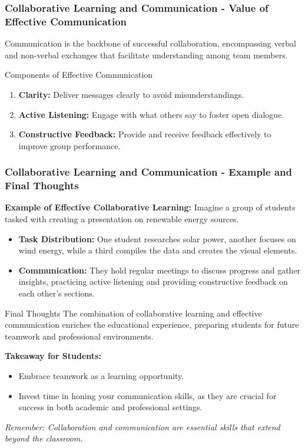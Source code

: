 \documentclass{beamer}
\begin{document}
\begin{frame}[fragile]
    \frametitle{Collaborative Learning and Communication - Value of Effective Communication}
    Communication is the backbone of successful collaboration, encompassing verbal and non-verbal exchanges that facilitate understanding among team members.
    
    \begin{block}{Components of Effective Communication}
        \begin{enumerate}
            \item \textbf{Clarity:} Deliver messages clearly to avoid misunderstandings.
            \item \textbf{Active Listening:} Engage with what others say to foster open dialogue.
            \item \textbf{Constructive Feedback:} Provide and receive feedback effectively to improve group performance.
        \end{enumerate}
    \end{block}
\end{frame}

\begin{frame}[fragile]
    \frametitle{Collaborative Learning and Communication - Example and Final Thoughts}
    \textbf{Example of Effective Collaborative Learning:} 
    Imagine a group of students tasked with creating a presentation on renewable energy sources.
    \begin{itemize}
        \item \textbf{Task Distribution:} One student researches solar power, another focuses on wind energy, while a third compiles the data and creates the visual elements. 
        \item \textbf{Communication:} They hold regular meetings to discuss progress and gather insights, practicing active listening and providing constructive feedback on each other’s sections.
    \end{itemize}

    \begin{block}{Final Thoughts}
        The combination of collaborative learning and effective communication enriches the educational experience, preparing students for future teamwork and professional environments.
    \end{block}

    \textbf{Takeaway for Students:}
    \begin{itemize}
        \item Embrace teamwork as a learning opportunity.
        \item Invest time in honing your communication skills, as they are crucial for success in both academic and professional settings.
    \end{itemize}
    
    \textit{Remember: Collaboration and communication are essential skills that extend beyond the classroom.}
\end{frame}
\end{document}
